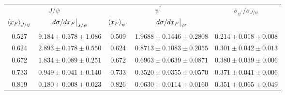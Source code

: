 \begin{tabular}{cc|cc|c}
\hline
\multicolumn{2}{c|}{$J/\psi$}                               & \multicolumn{2}{c|}{$\psi^{\prime}$}                                                    & \multirow{2}{*}{$\sigma_{\psi^\prime}/\sigma_{J/\psi}$} \\ \cline{1-4}
$\expval{x_F}_{J/\psi}$    & $\eval{d\sigma/dx_F}_{J/\psi}$ & $\expval{x_F}_{\psi^\prime}$ & $\eval{d\sigma/dx_F}_{\psi^\prime}$ &                                                         \\ \hline
\multicolumn{1}{c|}{0.527} & $9.184\pm0.378\pm1.086$        & \multicolumn{1}{c|}{0.509}                        & $1.9688\pm0.1446\pm0.2808$          & $0.214\pm0.018\pm0.008$                                 \\
\multicolumn{1}{c|}{0.624} & $2.893\pm0.178\pm0.550$        & \multicolumn{1}{c|}{0.624}                        & $0.8713\pm0.1083\pm0.2055$          & $0.301\pm0.042\pm0.013$                                 \\
\multicolumn{1}{c|}{0.672} & $1.834\pm0.089\pm0.251$        & \multicolumn{1}{c|}{0.672}                        & $0.6963\pm0.0639\pm0.0871$          & $0.380\pm0.039\pm0.006$                                 \\
\multicolumn{1}{c|}{0.733} & $0.949\pm0.041\pm0.140$        & \multicolumn{1}{c|}{0.733}                        & $0.3520\pm0.0355\pm0.0570$          & $0.371\pm0.041\pm0.006$                                 \\
\multicolumn{1}{c|}{0.819} & $0.180\pm0.008\pm0.023$        & \multicolumn{1}{c|}{0.826}                        & $0.0630\pm0.0114\pm0.0160$          & $0.351\pm0.065\pm0.049$                                 \\ \hline
\end{tabular}
